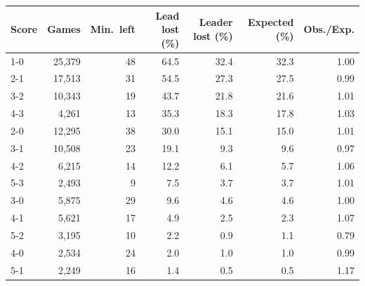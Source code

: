 \begin{tabular}{lrrrrrr}\toprule
Score & Games & Min.\ left & Lead lost (\%) & Leader lost (\%) & Expected (\%) & Obs./Exp.\\\midrule
1-0 & 25,379 & 48 & 64.5 & 32.4 & 32.3 & 1.00\\
2-1 & 17,513 & 31 & 54.5 & 27.3 & 27.5 & 0.99\\
3-2 & 10,343 & 19 & 43.7 & 21.8 & 21.6 & 1.01\\
4-3 & 4,261 & 13 & 35.3 & 18.3 & 17.8 & 1.03\\
2-0 & 12,295 & 38 & 30.0 & 15.1 & 15.0 & 1.01\\
3-1 & 10,508 & 23 & 19.1 & 9.3 & 9.6 & 0.97\\
4-2 & 6,215 & 14 & 12.2 & 6.1 & 5.7 & 1.06\\
5-3 & 2,493 & 9 & 7.5 & 3.7 & 3.7 & 1.01\\
3-0 & 5,875 & 29 & 9.6 & 4.6 & 4.6 & 1.00\\
4-1 & 5,621 & 17 & 4.9 & 2.5 & 2.3 & 1.07\\
5-2 & 3,195 & 10 & 2.2 & 0.9 & 1.1 & 0.79\\
4-0 & 2,534 & 24 & 2.0 & 1.0 & 1.0 & 0.99\\
5-1 & 2,249 & 16 & 1.4 & 0.5 & 0.5 & 1.17\\
\bottomrule\end{tabular}
